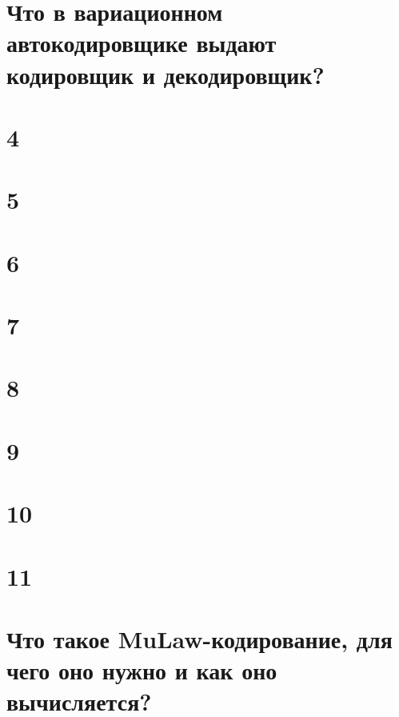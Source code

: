 \documentclass[14pt]{extarticle}
\begin{document}
	\newpage
	\section{Что в вариационном автокодировщике выдают кодировщик и декодировщик?} 
	
	
	\newpage
	\section{4} %
	
	
	\newpage
	\section{5} %
	
	
	\newpage
	\section{6} %
	
	
	\newpage
	\section{7} %
	
	
	\newpage
	
	\section{8} %
	
	
	\newpage
	
	\section{9} %
	
	
	\newpage
	
	\section{10} %
	
	
	\newpage
	
	\section{11}
	
	
	\newpage
	
	\section{Что такое MuLaw-кодирование, для чего оно нужно и как оно вычисляется?}
	
	
\end{document}
